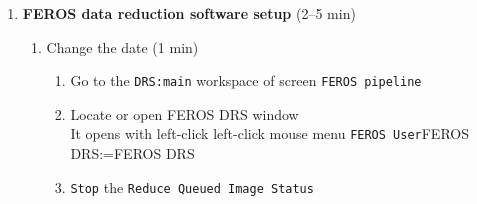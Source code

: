 \documentclass[11pt,fleqn]{book}
\makeatletter
\def\menu#1#2{\texttt{#1}\ifx{}#2\else\@for\@x:=#2\do{$\rightarrow$\texttt{\@x}}\fi}
\def\wmenu#1#2{window menu \menu{#1}{#2}}
\def\mmenu#1#2{left-click mouse menu \menu{#1}{#2}}
\def\procref#1{Procedure~\ref{proc:#1}, p.~\pageref{proc:#1}}
\def\figref#1{Fig.~\ref{fig:#1}, p.~\pageref{fig:#1}}
\makeatother
\begin{document}
\begin{enumerate}
\begin{enumerate}
\begin{enumerate}
                  \item If necessary, use \texttt{Start exposure} to change \texttt{CCD Status} to \texttt{Infinite loop}
                  \item Find window \texttt{Telescope R.T.D.}
                  \item Use \wmenu{TCS}{Attach camera}
                  \item A bias image should be seen within seconds
                  \item If it fails in the previous steps, go to \procref{restartgag} (3 min)
               \end{enumerate}
           \item Check the \gls{feros} autoguider (1--4 min)
               \begin{enumerate}
                  \item select  below \texttt{CCD change} (see \figref{agswitch})
                  \item If necessary, use \texttt{Start exposure} to change \texttt{CCD Status} to \texttt{Infinite loop}
                  \item Find window \texttt{E2P2 Real Time Display}
                  \item Click checkbox \texttt{Camera on/off} so that checkbox gets green
                  \item A bias image should be seen within seconds
                  \item Check that the image is horizontally flipped. 
                  \item If it fails in the previous steps, go to \procref{restartfag} (3 min)
               \end{enumerate}
        \end{enumerate}           
  \item\textbf{FEROS data reduction software setup} (2--5 min)
    \begin{enumerate}
        \item Change the date  (1 min)
        \label{list:drs}
		\begin{enumerate}
		  \item Go to the \texttt{DRS:main} workspace of screen \texttt{FEROS pipeline}
		  \item Locate or open FEROS DRS window\\
                It opens with left-click \mmenu{FEROS User}{FEROS DRS} 
		  \item \texttt{Stop} the \texttt{Reduce Queued Image Status}

\end{enumerate}
\end{enumerate}
\end{enumerate}
\end{document}
